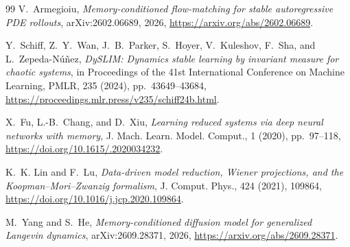\documentclass[final,hidelinks]{siamart251216}
\begin{document}
\begin{thebibliography}{99}
{\sc V.~Armegioiu},
{\em Memory-conditioned flow-matching for stable autoregressive PDE rollouts},
arXiv:2602.06689, 2026,
\url{https://arxiv.org/abs/2602.06689}.

{\sc Y.~Schiff, Z.~Y.~Wan, J.~B.~Parker, S.~Hoyer, V.~Kuleshov, F.~Sha, and L.~Zepeda-N\'u\~nez},
{\em DySLIM: Dynamics stable learning by invariant measure for chaotic systems},
in Proceedings of the 41st International Conference on Machine Learning,
PMLR, 235 (2024), pp.~43649--43684,
\url{https://proceedings.mlr.press/v235/schiff24b.html}.

{\sc X.~Fu, L.-B.~Chang, and D.~Xiu},
{\em Learning reduced systems via deep neural networks with memory},
J. Mach. Learn. Model. Comput., 1 (2020), pp.~97--118,
\url{https://doi.org/10.1615/.2020034232}.

{\sc K.~K. Lin and F.~Lu},
{\em Data-driven model reduction, Wiener projections, and the Koopman--Mori--Zwanzig formalism},
J. Comput. Phys., 424 (2021), 109864,
\url{https://doi.org/10.1016/j.jcp.2020.109864}.

{\sc M.~Yang and S.~He},
{\em Memory-conditioned diffusion model for generalized Langevin dynamics},
arXiv:2609.28371, 2026,
\url{https://arxiv.org/abs/2609.28371}.

\end{thebibliography}
\end{document}
